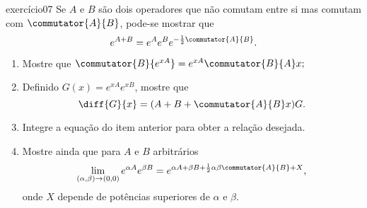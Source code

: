 \begin{exercício}{}{exercício07}
    Se \(A\) e \(B\) são dois operadores que não comutam entre si mas comutam com \(\commutator{A}{B}\), pode-se mostrar que 
    \begin{equation*}
        e^{A + B} = e^A e^B e^{-\frac12 \commutator{A}{B}}.
    \end{equation*}
    \begin{enumerate}[label=(\alph*)]
        \item Mostre que \(\commutator{B}{e^{xA}} = e^{xA} \commutator{B}{A}x;\)
        \item Definido \(G(x) = e^{xA}e^{xB}\), mostre que
            \begin{equation*}
                \diff{G}{x} = (A + B + \commutator{A}{B}x)G.
            \end{equation*}
        \item Integre a equação do item anterior para obter a relação desejada.
        \item Mostre ainda que para \(A\) e \(B\) arbitrários
            \begin{equation*}
                \lim_{(\alpha, \beta)\to (0,0)} e^{\alpha A} e^{\beta B} = e^{\alpha A + \beta B + \frac12 \alpha \beta \commutator{A}{B} + X},
            \end{equation*}
            onde \(X\) depende de potências superiores de \(\alpha\) e \(\beta\).
    \end{enumerate}
\end{exercício}
